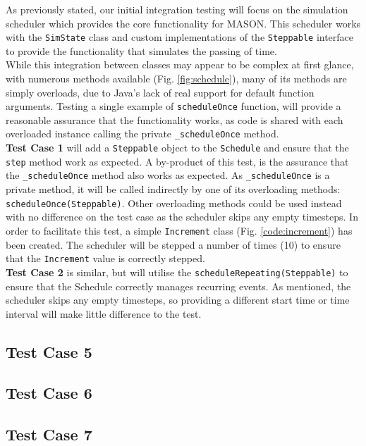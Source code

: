 \documentclass[11pt]{article}
\begin{document}
As previously stated, our initial integration testing will focus on the simulation scheduler which provides the core functionality for MASON.
This scheduler works with the \texttt{SimState} class and custom implementations of the \texttt{Steppable} interface to provide the functionality that simulates the passing of time.
\\

While this integration between classes may appear to be complex at first glance, with numerous methods available (Fig. \ref{fig:schedule}), many of its methods are simply overloads,  due to Java's lack of real support for default function arguments.
Testing a single example of \texttt{scheduleOnce} function, will provide a reasonable assurance that the functionality works, as code is shared with each overloaded instance calling the private \texttt{\_scheduleOnce} method.
\\

\textbf{Test Case 1} will add a \texttt{Steppable} object to the \texttt{Schedule} and ensure that the \texttt{step} method work as expected.
A by-product of this test, is the assurance that the \texttt{\_scheduleOnce} method also works as expected.
As \texttt{\_scheduleOnce} is a private method, it will be called indirectly by one of its overloading methods: \texttt{scheduleOnce(Steppable)}.
Other overloading methods could be used instead with no difference on the test case as the scheduler skips any empty timesteps.
In order to facilitate this test, a simple \texttt{Increment} class (Fig. \ref{code:increment}) has been created.
The scheduler will be stepped a number of times (10) to ensure that the \texttt{Increment} value is correctly stepped.
\\

\textbf{Test Case 2} is similar, but will utilise the \texttt{scheduleRepeating(Steppable)} to ensure that the Schedule correctly manages recurring events.
As mentioned, the scheduler skips any empty timesteps, so providing a different start time or time interval will make little difference to the test.
\\

\subsection{Test Case 5}
\subsection{Test Case 6}
\subsection{Test Case 7}
\end{document}
